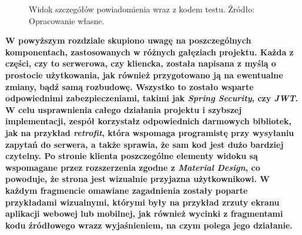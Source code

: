 \documentclass[twoside]{projektInzynierskiMS}
\numberwithin{figure}{section}
\begin{document}
\begin{figure}[h!]
\caption{Widok szczegółów powiadomienia wraz z kodem testu. Źródło: Opracowanie własne.}
\label{fig:mobile_notification_details}
\end{figure}
\newpage

\textbf{W powyższym rozdziale skupiono uwagę na poszczególnych komponentach, zastosowanych w różnych gałęziach projektu. Każda z części, czy to serwerowa, czy kliencka, została napisana z myślą o prostocie użytkowania, jak również przygotowano ją na ewentualne zmiany, bądź samą rozbudowę. Wszystko to zostało wsparte odpowiednimi zabezpieczeniami, takimi jak \textit{Spring Security}, czy \textit{JWT}. W celu usprawnienia całego działania projektu i szybszej implementacji, zespół korzystał\linebreak z odpowiednich darmowych bibliotek, jak na przykład \textit{retrofit}, która wspomaga programistę przy wysyłaniu zapytań do serwera, a także sprawia, że sam kod jest dużo bardziej czytelny. Po stronie klienta poszczególne elementy widoku są wspomagane przez rozszerzenia zgodne z \textit{Material Design}, co powoduje, że strona jest wizualnie przyjazna użytkownikowi. W każdym fragmencie omawiane zagadnienia zostały poparte przykładami wizualnymi, którymi były na przykład zrzuty ekranu aplikacji webowej lub mobilnej, jak również wycinki z fragmentami kodu źródłowego wraz\linebreak z wyjaśnieniem, na czym polega jego działanie.}
\end{document}
